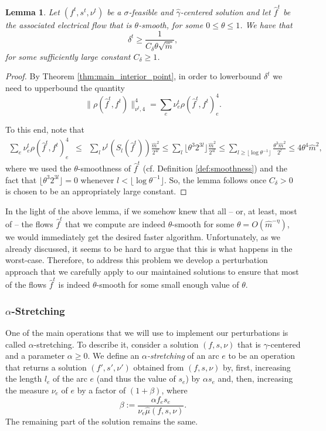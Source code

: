 \documentclass[11pt, letterpaper]{article}
\newtheorem{lemma}[theorem]{Lemma}
\newcommand{\cdelta}{C_{\delta}}
\newcommand{\floor}[1]{\lfloor #1 \rfloor}
\newcommand{\norm}[2]{\|#1\|_{#2}}
\newcommand{\hm}{\widehat{m}}
\newcommand{\Cset}[2]{S_{#1}(#2)}
\newcommand{\hmu}{\hat{\mu}}
\newcommand{\hl}{\hat{l}}
\newcommand{\hgamma}{\hat{\gamma}}
\newcommand{\vrho}{\boldsymbol{\mathit{\rho}}}
\newcommand{\vnu}{\boldsymbol{\mathit{\nu}}}
\newcommand{\vsigma}{\boldsymbol{\mathit{\sigma}}}
\newcommand{\ff}{\boldsymbol{\mathit{f}}}
\newcommand{\hff}{\boldsymbol{\mathit{\hat{f}}}}
\renewcommand{\ss}{\boldsymbol{\mathit{s}}}
\begin{document}
\begin{lemma}
\label{lem:better_delta_lowerbound}
Let $(\ff^t,\ss^t,\vnu^t)$ be a $\vsigma$-feasible and $\hgamma$-centered solution and let $\hff^t$ be the associated electrical flow that is $\theta$-smooth, for some $0\leq \theta\leq 1$. We have that
\[
\delta^t \geq \frac{1}{\cdelta\theta \sqrt{\hm}},
\]
for some sufficiently large constant $\cdelta\geq 1$.
\end{lemma}

\begin{proof}
By Theorem \ref{thm:main_interior_point}, in order to lowerbound $\delta^t$ we need to upperbound the quantity
\[
\norm{\vrho(\hff^t,\ff^t)}{\vnu^t,4}^4 = \sum_e \nu_e^t \rho(\hff^t,\ff^t)_e^4.
\] 

To this end, note that 
\begin{eqnarray*}
\sum_e \nu_e^t \rho(\hff^t,\ff^t)_e^4 & \leq & \sum_l \vnu^t(\Cset{l}{\hff^t}) \frac{\hm^2}{2^{4l}} \leq \sum_l  \floor{\theta^3 2^{3l}} \frac{\hm^2}{2^{4l}}\leq \sum_{l\geq \floor{\log \theta^{-1}}}  \frac{\theta^{3}\hm^2}{2^{l}}\leq 4\theta^{4}\hm^2,
\end{eqnarray*}
where we used the $\theta$-smoothness of $\hff^t$ (cf. Definition \ref{def:smoothness}) and the fact that $\floor{\theta^3 2^{3l}}=0$ whenever $l<\floor{\log \theta^{-1}}$. So, the lemma follows once $\cdelta>0$ is chosen to be an appropriately large constant.
\end{proof}


In the light of the above lemma, if we somehow knew that all -- or, at least, most of -- the flows $\hff^t$ that we compute are indeed $\theta$-smooth for some  $\theta=O(\hm^{-\eta})$, we would immediately get the desired faster algorithm. Unfortunately, as we already discussed, it seems to be hard to argue that this is what happens in the worst-case.  Therefore, to address this problem we develop a perturbation approach that we carefully apply to our maintained solutions to ensure that most of the flows $\hff^t$ is indeed $\theta$-smooth for some small enough value of $\theta$. 



\subsubsection*{$\alpha$-Stretching}

One of the main operations that we will use to implement our perturbations is called $\alpha$-stretching. To describe it, consider a solution $(\ff,\ss,\vnu)$ that is $\gamma$-centered and a parameter $\alpha\geq 0$. We define an {\em $\alpha$-stretching} of an arc $e$ to be an operation that returns a solution $(\ff',\ss',\vnu')$ obtained from $(\ff,\ss,\vnu)$ by, first, increasing the length $\hl_e$ of the arc $e$ (and thus the value of $s_e$) by $\alpha s_e$ and, then, increasing the measure $\nu_e$ of $e$ by a factor of $(1+\beta)$, where
\begin{equation}
\label{eq:def_of_beta}
\beta:=\frac{\alpha f_e s_e}{\nu_e\hmu(\ff,\ss,\vnu)}.
\end{equation}
The remaining part of the solution remains the same.
\end{document}
